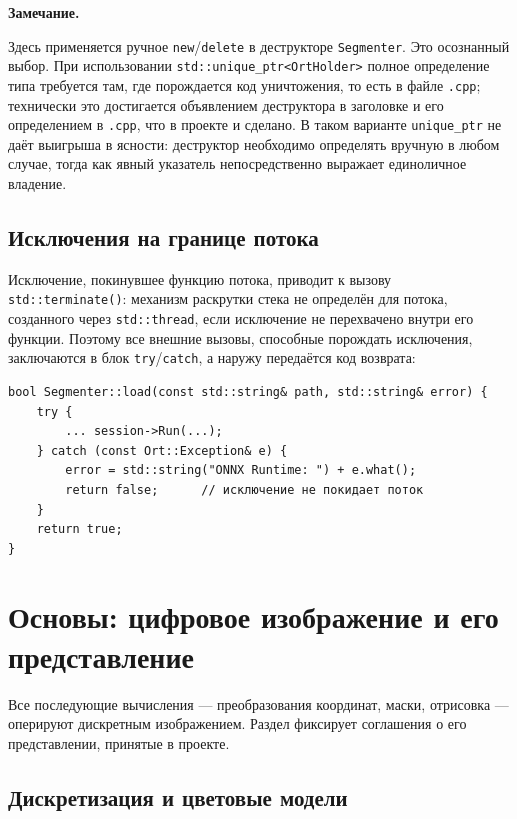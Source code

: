 \documentclass[11pt,a4paper]{article}
\theoremstyle{definition}
\theoremstyle{remark}
\newenvironment{note}
  {\par\medskip\noindent
   \begin{lrbox}{\notebox}%
   \begin{minipage}{0.93\linewidth}%
   \small\textbf{Замечание.}\par\vspace{1pt}\noindent\ignorespaces}
  {\end{minipage}%
   \end{lrbox}%
   \fboxsep=6pt\relax
   \colorbox{codebg}{\usebox{\notebox}}%
   \par\medskip}
\begin{document}
\begin{note}
Здесь применяется ручное \texttt{new}/\texttt{delete} в деструкторе
\texttt{Segmenter}. Это осознанный выбор. При использовании
\texttt{std::unique\_ptr<OrtHolder>} полное определение типа требуется там, где
порождается код уничтожения, то есть в файле \texttt{.cpp}; технически это
достигается объявлением деструктора в заголовке и его определением в
\texttt{.cpp}, что в проекте и сделано. В таком варианте
\texttt{unique\_ptr} не даёт выигрыша в ясности: деструктор необходимо
определять вручную в любом случае, тогда как явный указатель непосредственно
выражает единоличное владение.
\end{note}

\subsection{Исключения на границе потока}

Исключение, покинувшее функцию потока, приводит к вызову
\texttt{std::terminate()}: механизм раскрутки стека не определён для потока,
созданного через \texttt{std::thread}, если исключение не перехвачено внутри
его функции. Поэтому все внешние вызовы, способные порождать исключения,
заключаются в блок \texttt{try}/\texttt{catch}, а наружу передаётся код
возврата:

\begin{lstlisting}
bool Segmenter::load(const std::string& path, std::string& error) {
    try {
        ... session->Run(...);
    } catch (const Ort::Exception& e) {
        error = std::string("ONNX Runtime: ") + e.what();
        return false;      // исключение не покидает поток
    }
    return true;
}
\end{lstlisting}

\section{Основы: цифровое изображение и его представление}
\label{sec:found-image}

Все последующие вычисления --- преобразования координат, маски, отрисовка ---
оперируют дискретным изображением. Раздел фиксирует соглашения о его
представлении, принятые в проекте.

\subsection{Дискретизация и цветовые модели}
\end{document}
